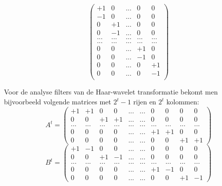 \begin{enumerate}
{\begin{itemize}
$$\begin{pmatrix}
			+1 & 0 & ... & 0 & 0 \\
			-1 & 0 & ... & 0 & 0 \\
			0 & +1 &  ... & 0 & 0 \\
			0 & -1 &  ... & 0 & 0 \\
			... & ... & ... & ... & ... \\
			... & ... & ... & ... & ... \\
		 	0 & 0 & ... & +1 & 0  \\
		 	0 & 0 & ... & -1 & 0  \\
		 	0 & 0 & ... & 0 & +1  \\
		 	0 & 0 & ... & 0 & -1  \\
		\end{pmatrix}
		$$

		Voor de analyse filters van de Haar-wavelet transformatie bekomt men bijvoorbeeld volgende matrices met $2^t - 1$  rijen en $2^t$ kolommen:
		$$
		A^t =
		\begin{pmatrix}
			+1&+1&0&0&...&...&0&0&0&0 \\
			0&0&+1&+1&...&...&0&0&0&0 \\
			...&...&...&...&...&...&...&...&...&...\\
			0&0&0&0&...&...&+1&+1&0&0\\
			0&0&0&0&...&...&0&0&+1&+1
		\end{pmatrix}
		$$
		$$
		B^t =
		\begin{pmatrix}
			+1&-1&0&0&...&...&0&0&0&0 \\
			0&0&+1&-1&...&...&0&0&0&0 \\
			...&...&...&...&...&...&...&...&...&...\\
			0&0&0&0&...&...&+1&-1&0&0\\
			0&0&0&0&...&...&0&0&+1&-1
		\end{pmatrix}
		$$


	\end{itemize}
	}
	

\end{enumerate}
